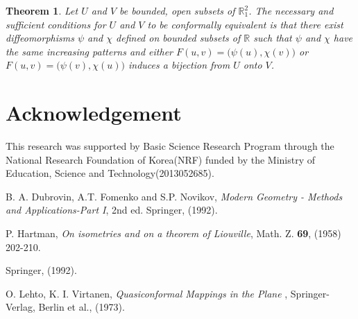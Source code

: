 \documentclass[a4paper,10pt]{amsart}
\theoremstyle{plain}
\newtheorem{thm}{Theorem}[section]
\newtheorem*{main theorem}{Theorem}
\theoremstyle{definition}
\begin{document}
\begin{thm}
Let $U$ and $V$ be bounded, open subsets of $\mathbb{R}^2_1$. The
necessary and sufficient conditions for $U$ and $V$ to be
conformally equivalent is that there exist diffeomorphisms $\psi$
and $\chi$ defined on bounded subsets of $\mathbb{R}$ such that
$\psi$ and $\chi$ have the same increasing patterns and either
$F(u,v) = \big( \psi(u), \chi(v) \big)$ or $F(u,v) = \big(
\psi(v), \chi(u) \big)$ induces a bijection from $U$ onto $V$.
\end{thm}




























\section{Acknowledgement}

This research was supported by Basic Science Research Program
through the National Research Foundation of Korea(NRF) funded by
the Ministry of Education, Science and Technology(2013052685).






























\begin{thebibliography}{999}



%
 B. A. Dubrovin, A.T. Fomenko and S.P. Novikov,
{\it Modern Geometry - Methods and Applications-Part I}, 2nd ed.
Springer, (1992).

%
 P. Hartman,
{\it On isometries and on a theorem of Liouville}, Math. Z. {\bf
69}, (1958) 202-210.

Springer, (1992).


%
 O. Lehto, K. I. Virtanen,
{\it Quasiconformal Mappings in the Plane }, Springer-Verlag,
Berlin et al., (1973).









\end{thebibliography}
\end{document}
